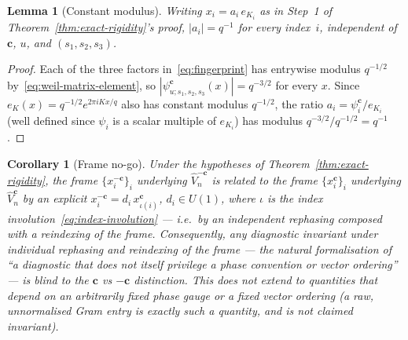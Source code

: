 \documentclass[11pt,a4paper]{article}
\newtheorem{lemma}[theorem]{Lemma}
\newtheorem{corollary}[theorem]{Corollary}
\begin{document}
    \begin{lemma}[Constant modulus]
      \label{lem:constant-modulus}
      Writing $x_i = a_i\, e_{K_i}$ as in Step~1 of Theorem~\ref{thm:exact-rigidity}'s proof,
      $|a_i| = q^{-1}$ for every index~$i$, independent of $\mathbf c$, $u$, and $(s_1,s_2,s_3)$.
    \end{lemma}

    \begin{proof}
      Each of the three factors in~\eqref{eq:fingerprint} has entrywise modulus $q^{-1/2}$
      by~\eqref{eq:weil-matrix-element}, so $|\psi^{\mathbf c}_{u;s_1,s_2,s_3}(x)| = q^{-3/2}$ for
      every $x$. Since $e_K(x) = q^{-1/2}e^{2\pi i Kx/q}$ also has constant modulus $q^{-1/2}$, the
      ratio $a_i = \psi^{\mathbf c}_i / e_{K_i}$ (well defined since $\psi_i$ is a scalar multiple of
      $e_{K_i}$) has modulus $q^{-3/2}/q^{-1/2} = q^{-1}$.
    \end{proof}

    \begin{corollary}[Frame no-go]
      \label{cor:frame-nogo}
      Under the hypotheses of Theorem~\ref{thm:exact-rigidity}, the frame
      $\{x_i^{-\mathbf c}\}_{i}$ underlying $\widehat V_n^{-\mathbf{c}}$ is related to the frame
      $\{x_i^{\mathbf c}\}_i$ underlying $\widehat V_n^{\mathbf{c}}$ by an explicit
      $x_i^{-\mathbf c} = d_i\, x_{\iota(i)}^{\mathbf c}$, $d_i \in U(1)$, where $\iota$ is the
      index involution~\eqref{eq:index-involution} --- i.e.\ by an independent rephasing composed
      with a reindexing of the frame. Consequently, any diagnostic invariant under individual
      rephasing and reindexing of the frame --- the natural formalisation of ``a diagnostic that does
      not itself privilege a phase convention or vector ordering'' --- is blind to the $\mathbf{c}$ vs
      $-\mathbf{c}$ distinction. This does \emph{not} extend to quantities that depend on an
      arbitrarily fixed phase gauge or a fixed vector ordering (a raw, unnormalised Gram entry is
      exactly such a quantity, and is not claimed invariant).
    \end{corollary}
\end{document}
